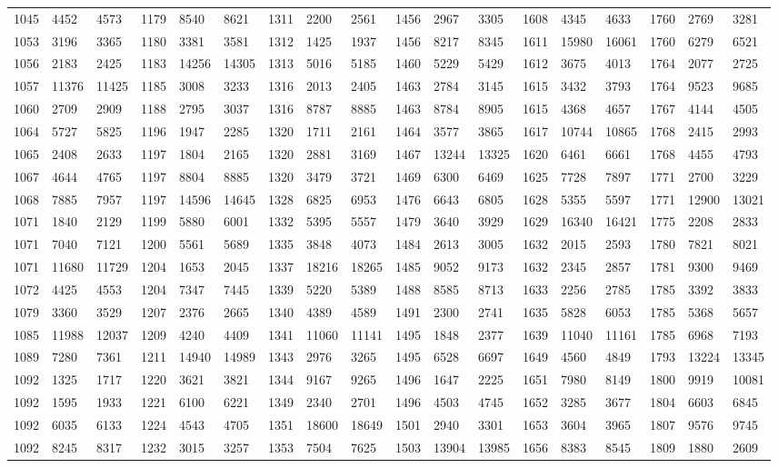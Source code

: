 \begin{center}
\begin{longtable}{*5{A@{\hspace*{5mm}}A}}
1045&4452&4573&1179&8540&8621&1311&2200&2561&1456&2967&3305&1608&4345&4633&1760&2769&3281\\
1053&3196&3365&1180&3381&3581&1312&1425&1937&1456&8217&8345&1611&15980&16061&1760&6279&6521\\
1056&2183&2425&1183&14256&14305&1313&5016&5185&1460&5229&5429&1612&3675&4013&1764&2077&2725\\
1057&11376&11425&1185&3008&3233&1316&2013&2405&1463&2784&3145&1615&3432&3793&1764&9523&9685\\
1060&2709&2909&1188&2795&3037&1316&8787&8885&1463&8784&8905&1615&4368&4657&1767&4144&4505\\
1064&5727&5825&1196&1947&2285&1320&1711&2161&1464&3577&3865&1617&10744&10865&1768&2415&2993\\
1065&2408&2633&1197&1804&2165&1320&2881&3169&1467&13244&13325&1620&6461&6661&1768&4455&4793\\
1067&4644&4765&1197&8804&8885&1320&3479&3721&1469&6300&6469&1625&7728&7897&1771&2700&3229\\
1068&7885&7957&1197&14596&14645&1328&6825&6953&1476&6643&6805&1628&5355&5597&1771&12900&13021\\
1071&1840&2129&1199&5880&6001&1332&5395&5557&1479&3640&3929&1629&16340&16421&1775&2208&2833\\
1071&7040&7121&1200&5561&5689&1335&3848&4073&1484&2613&3005&1632&2015&2593&1780&7821&8021\\
1071&11680&11729&1204&1653&2045&1337&18216&18265&1485&9052&9173&1632&2345&2857&1781&9300&9469\\
1072&4425&4553&1204&7347&7445&1339&5220&5389&1488&8585&8713&1633&2256&2785&1785&3392&3833\\
1079&3360&3529&1207&2376&2665&1340&4389&4589&1491&2300&2741&1635&5828&6053&1785&5368&5657\\
1085&11988&12037&1209&4240&4409&1341&11060&11141&1495&1848&2377&1639&11040&11161&1785&6968&7193\\
1089&7280&7361&1211&14940&14989&1343&2976&3265&1495&6528&6697&1649&4560&4849&1793&13224&13345\\
1092&1325&1717&1220&3621&3821&1344&9167&9265&1496&1647&2225&1651&7980&8149&1800&9919&10081\\
1092&1595&1933&1221&6100&6221&1349&2340&2701&1496&4503&4745&1652&3285&3677&1804&6603&6845\\
1092&6035&6133&1224&4543&4705&1351&18600&18649&1501&2940&3301&1653&3604&3965&1807&9576&9745\\
1092&8245&8317&1232&3015&3257&1353&7504&7625&1503&13904&13985&1656&8383&8545&1809&1880&2609\\

\end{longtable}
\end{center}
